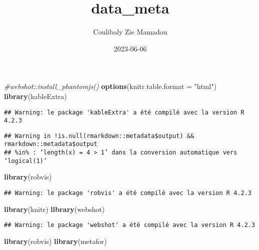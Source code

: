 \documentclass[
]{article}
\title{data\_meta}
\author{Coulibaly Zie Mamadou}
\date{2023-06-06}
\newenvironment{Shaded}{\begin{snugshade}}{\end{snugshade}}
\newcommand{\AttributeTok}[1]{\textcolor[rgb]{0.13,0.29,0.53}{#1}}
\newcommand{\CommentTok}[1]{\textcolor[rgb]{0.56,0.35,0.01}{\textit{#1}}}
\newcommand{\FunctionTok}[1]{\textcolor[rgb]{0.13,0.29,0.53}{\textbf{#1}}}
\newcommand{\NormalTok}[1]{#1}
\newcommand{\StringTok}[1]{\textcolor[rgb]{0.31,0.60,0.02}{#1}}
\begin{document}
\maketitle

\begin{Shaded}
\begin{Highlighting}[]
\CommentTok{\#webshot::install\_phantomjs()}
\FunctionTok{options}\NormalTok{(}\AttributeTok{knitr.table.format =} \StringTok{"html"}\NormalTok{)}
\FunctionTok{library}\NormalTok{(kableExtra)}
\end{Highlighting}
\end{Shaded}

\begin{verbatim}
## Warning: le package 'kableExtra' a été compilé avec la version R 4.2.3
\end{verbatim}

\begin{verbatim}
## Warning in !is.null(rmarkdown::metadata$output) && rmarkdown::metadata$output
## %in% : ‘length(x) = 4 > 1’ dans la conversion automatique vers ‘logical(1)’
\end{verbatim}

\begin{Shaded}
\begin{Highlighting}[]
\FunctionTok{library}\NormalTok{(robvis)}
\end{Highlighting}
\end{Shaded}

\begin{verbatim}
## Warning: le package 'robvis' a été compilé avec la version R 4.2.3
\end{verbatim}

\begin{Shaded}
\begin{Highlighting}[]
\FunctionTok{library}\NormalTok{(knitr)}
\FunctionTok{library}\NormalTok{(webshot)}
\end{Highlighting}
\end{Shaded}

\begin{verbatim}
## Warning: le package 'webshot' a été compilé avec la version R 4.2.3
\end{verbatim}

\begin{Shaded}
\begin{Highlighting}[]
\FunctionTok{library}\NormalTok{(robvis)}
\FunctionTok{library}\NormalTok{(metafor)}
\end{Highlighting}
\end{Shaded}
\end{document}
